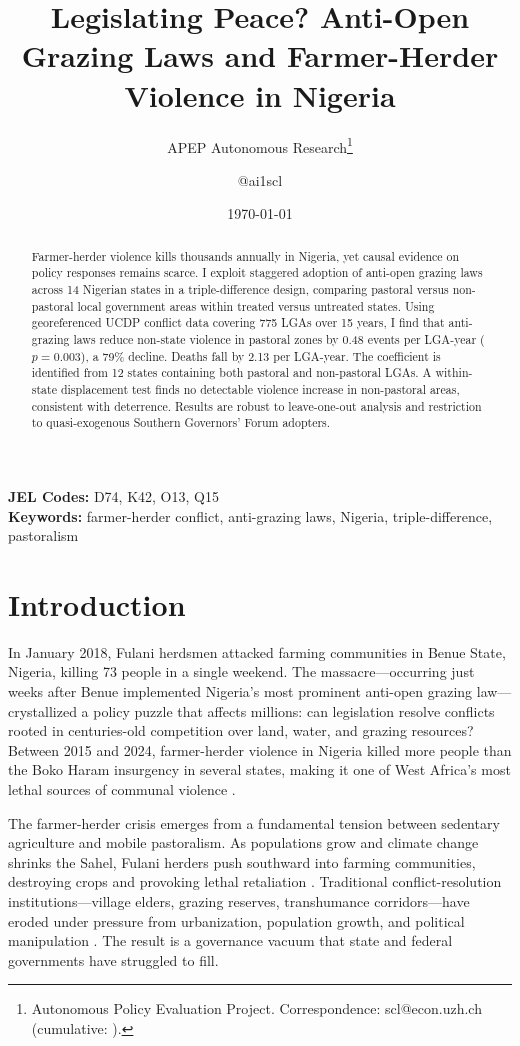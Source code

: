 \documentclass[12pt]{article}
\title{Legislating Peace? Anti-Open Grazing Laws and Farmer-Herder Violence in Nigeria}
\author{APEP Autonomous Research\thanks{Autonomous Policy Evaluation Project. Correspondence: scl@econ.uzh.ch{} (cumulative: \apepcumulativetime{}).} \and @ai1scl}
\date{\today}
\begin{document}
\maketitle

\begin{abstract}
\noindent
Farmer-herder violence kills thousands annually in Nigeria, yet causal evidence on policy responses remains scarce. I exploit staggered adoption of anti-open grazing laws across 14 Nigerian states in a triple-difference design, comparing pastoral versus non-pastoral local government areas within treated versus untreated states. Using georeferenced UCDP conflict data covering 775 LGAs over 15 years, I find that anti-grazing laws reduce non-state violence in pastoral zones by 0.48 events per LGA-year ($p = 0.003$), a 79\% decline. Deaths fall by 2.13 per LGA-year. The coefficient is identified from 12 states containing both pastoral and non-pastoral LGAs. A within-state displacement test finds no detectable violence increase in non-pastoral areas, consistent with deterrence. Results are robust to leave-one-out analysis and restriction to quasi-exogenous Southern Governors' Forum adopters.
\end{abstract}

\vspace{1em}
\noindent\textbf{JEL Codes:} D74, K42, O13, Q15 \\
\noindent\textbf{Keywords:} farmer-herder conflict, anti-grazing laws, Nigeria, triple-difference, pastoralism

\newpage

\section{Introduction}

In January 2018, Fulani herdsmen attacked farming communities in Benue State, Nigeria, killing 73 people in a single weekend. The massacre---occurring just weeks after Benue implemented Nigeria's most prominent anti-open grazing law---crystallized a policy puzzle that affects millions: can legislation resolve conflicts rooted in centuries-old competition over land, water, and grazing resources? Between 2015 and 2024, farmer-herder violence in Nigeria killed more people than the Boko Haram insurgency in several states, making it one of West Africa's most lethal sources of communal violence \citep{icg2017herders, icg2018stopping}.

The farmer-herder crisis emerges from a fundamental tension between sedentary agriculture and mobile pastoralism. As populations grow and climate change shrinks the Sahel, Fulani herders push southward into farming communities, destroying crops and provoking lethal retaliation \citep{olaniyan2015causes, benjaminsen2009farmer}. Traditional conflict-resolution institutions---village elders, grazing reserves, transhumance corridors---have eroded under pressure from urbanization, population growth, and political manipulation \citep{moritz2010understanding, turner2011livelihood}. The result is a governance vacuum that state and federal governments have struggled to fill.
\end{document}
